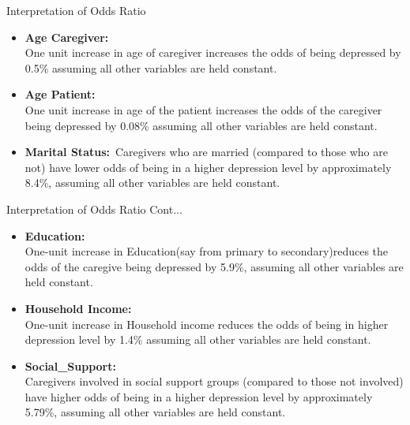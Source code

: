 \documentclass{beamer}
\numberwithin{equation}{section}
\numberwithin{table}{section}
\begin{document}
\begin{frame}{Interpretation of Odds Ratio}
\begin{itemize}
	\item \textbf{Age Caregiver:}\\
	\noindent One unit increase in age of caregiver increases the odds of being depressed by 0.5\% assuming all other variables are held constant.
	
	\item \textbf{Age Patient:}\\
	\noindent One unit increase in age of the patient increases the odds of the caregiver being depressed by 0.08\% assuming all other variables are held constant.
	
	\item \textbf{Marital Status:}\
	\noindent Caregivers who are married (compared to those who are not) have lower odds of being in a higher depression level by approximately 8.4\%, assuming all other variables are held constant.
\end{itemize}
\end{frame}
\begin{frame}{Interpretation of Odds Ratio Cont...}
	\begin{itemize}
	\item \textbf{Education:} \\
	\noindent One-unit increase in Education(say from primary to secondary)reduces the odds of the caregive being depressed by 5.9\%,  assuming all other variables are held constant.
	
	\item \textbf{Household Income:} \\
	\noindent One-unit increase in Household income reduces the odds of being in higher depression level by 1.4\% assuming all other variables are held constant.
	
	\item \textbf{Social\_Support:} \\
	\noindent Caregivers involved in social support groups (compared to those not involved) have higher odds of being in a higher depression level by approximately 5.79\%, assuming all other variables are held constant.
	\end{itemize}
\end{frame}
\end{document}
